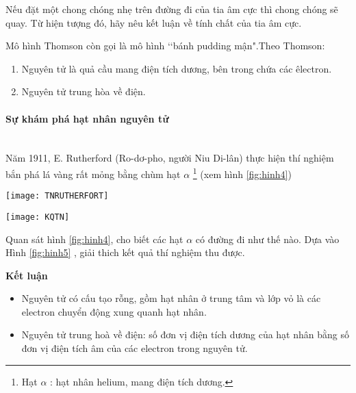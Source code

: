 %
\begin{hoivadap}
	Nếu đặt một chong chóng nhẹ trên đường đi của tia âm cực thì chong chóng sẽ quay. Từ hiện tượng đó, hãy nêu kết luận về tính chất của tia âm cực.
\end{hoivadap}
\newpage
\vspace*{6pt}
\begin{emcobiet}
	 Mô hình Thomson còn gọi là mô hình \lq\lq bánh pudding mận".Theo Thomson:
	\begin{enumerate}
		\item Nguyên tử là quả cầu mang điện tích dương, bên trong chứa các êlectron.
	    \item Nguyên tử trung hòa về điện.
	\end{enumerate}
\end{emcobiet}
%
%
\paragraph{Sự khám phá hạt nhân nguyên tử}
\\
Năm 1911, E. Rutherford (Ro-dơ-pho, người Niu Di-lân) thực hiện thí nghiệm bắn phá lá vàng rất mỏng bằng chùm hạt $ \alpha $ \footnote{Hạt $\alpha$ : hạt nhân helium, mang điện tích dương.} (xem hình \ref{fig:hinh4})
\begin{center}
		\texttt{[image: TNRUTHERFORT]}\\
		\label{fig:hinh4}
\end{center}
%
\begin{center}
\texttt{[image: KQTN]}\\
\label{fig:hinh5}
\end{center}
%
\begin{hoivadap}
	Quan sát hình \ref{fig:hinh4}, cho biết các hạt $\alpha$ có đường đi như thế nào. Dựa vào Hình \ref{fig:hinh5} , giải thich kết quả thí nghiệm thu được.
\end{hoivadap}
\vspace*{6pt}
\begin{hoplythuyet}
	{\bfseries{Kết luận}}
	\begin{itemize}
	\item Nguyên tử có cấu tạo rỗng, gồm hạt nhân ở trung tâm và lớp vỏ là các electron chuyển động xung quanh hạt nhân.
	\item Nguyên tử trung hoà về điện: số đơn vị điện tích dương của hạt nhân bằng số đơn vị điện tích âm của các electron trong nguyên tử.
	\end{itemize}
\end{hoplythuyet}
